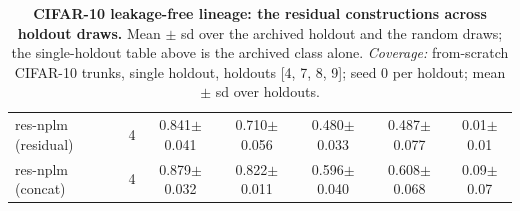 \begin{table}[t]
\begin{tabular}{lcccccc}
\quad res-nplm (residual) & 4 & 0.841$\pm$0.041 & 0.710$\pm$0.056 & 0.480$\pm$0.033 & 0.487$\pm$0.077 & 0.01$\pm$0.01 \\
\quad res-nplm (concat) & 4 & 0.879$\pm$0.032 & 0.822$\pm$0.011 & 0.596$\pm$0.040 & 0.608$\pm$0.068 & 0.09$\pm$0.07 \\
\bottomrule
\end{tabular}
\caption{\textbf{CIFAR-10 leakage-free lineage: the residual constructions across holdout draws.} Mean $\pm$ sd over the archived holdout and the random draws; the single-holdout table above is the archived class alone. \emph{Coverage:} from-scratch CIFAR-10 trunks, single holdout, holdouts [4, 7, 8, 9]; seed 0 per holdout; mean $\pm$ sd over holdouts.}
\label{tab:app_cifar10_residual_draws}
\end{table}
